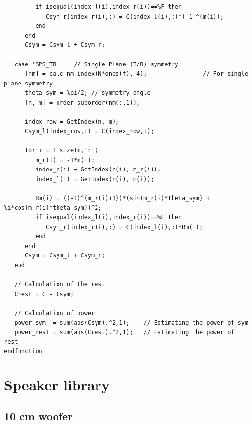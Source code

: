 \documentclass{report}
\begin{document}
\begin{appendices}
\begin{lstlisting}
         if isequal(index_l(i),index_r(i))==%F then
            Csym_r(index_r(i),:) = C(index_l(i),:)*(-1)^(m(i));
         end
      end
      Csym = Csym_l + Csym_r;
      
   case 'SPS_TB'	// Single Plane (T/B) symmetry
      [nm] = calc_nm_index(N*ones(f), 4);                // For single plane symmetry
      theta_sym = %pi/2; // symmetry angle  
      [n, m] = order_suborder(nm(:,1));  
      
      index_row = GetIndex(n, m);
      Csym_l(index_row,:) = C(index_row,:); 
      
      for i = 1:size(m,'r')
         m_r(i) = -1*m(i);
         index_r(i) = GetIndex(n(i), m_r(i));
         index_l(i) = GetIndex(n(i), m(i));
         
         Rm(i) = ((-1)^(m_r(i)+1))*(sin(m_r(i)*theta_sym) + %i*cos(m_r(i)*theta_sym))^2;
         if isequal(index_l(i),index_r(i))==%F then
            Csym_r(index_r(i),:) = C(index_l(i),:)*Rm(i);
         end
      end
      Csym = Csym_l + Csym_r;
   end
   
   // Calculation of the rest 
   Crest = C - Csym;
   
   // Calculation of power
   power_sym  = sum(abs(Csym).^2,1);    // Estimating the power of sym
   power_rest = sum(abs(Crest).^2,1);   // Estimating the power of rest
endfunction
\end{lstlisting}

\chapter{Speaker library}
\label{chap:spk_lib}

\section{10 cm woofer}
\label{spkrlib:10cm}


\end{appendices}
\end{document}
